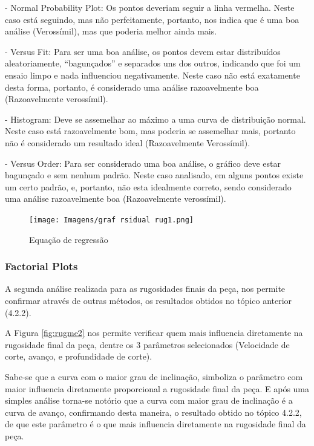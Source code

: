 \documentclass[deposito, acronym, symbols]{fei}
\begin{document}
- Normal Probability Plot: Os pontos deveriam seguir a linha vermelha. Neste caso está seguindo, mas não perfeitamente, portanto, nos indica que é uma boa análise (Verossímil), mas que poderia melhor ainda mais. 

- Versus Fit: Para ser uma boa análise, os pontos devem estar distribuídos aleatoriamente, “bagunçados” e separados uns dos outros, indicando que foi um ensaio limpo e nada influenciou negativamente. Neste caso não está exatamente desta forma, portanto, é considerado uma análise razoavelmente boa (Razoavelmente verossímil).

- Histogram: Deve se assemelhar ao máximo a uma curva de distribuição normal. Neste caso está razoavelmente bom, mas poderia se assemelhar mais, portanto não é considerado um resultado ideal (Razoavelmente Verossímil).

- Versus Order: Para ser considerado uma boa análise, o gráfico deve estar bagunçado e sem nenhum padrão. Neste caso analisado, em alguns pontos existe um certo padrão, e, portanto, não esta idealmente correto, sendo considerado uma análise razoavelmente boa (Razoavelmente verossímil).

\begin{figure}[!htp]
    \centering
    \caption{Equação de regressão}
    \texttt{[image: Imagens/graf rsidual rug1.png]}
    \label{fig: ruggr1}
\end{figure}

\subsubsection{Factorial Plots}

A segunda análise realizada para as rugosidades finais da peça, nos permite confirmar através de outras métodos, os resultados obtidos no tópico anterior (4.2.2).

A Figura \ref{fig:rugme2} nos permite verificar quem mais influencia diretamente na rugosidade final da peça, dentre os 3 parâmetros selecionados (Velocidade de corte, avanço, e profundidade de corte).

Sabe-se que a curva com o maior grau de inclinação, simboliza o parâmetro com maior influencia diretamente proporcional a rugosidade final da peça. E após uma simples análise torna-se notório que a curva com maior grau de inclinação é a curva de avanço, confirmando desta maneira, o resultado obtido no tópico 4.2.2, de que este parâmetro é o que mais influencia diretamente na rugosidade final da peça.
\end{document}
